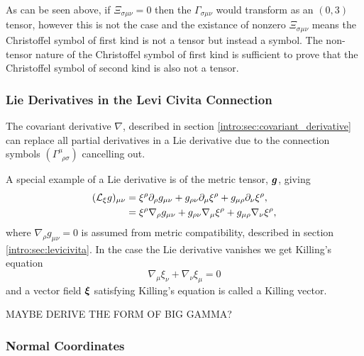 As can be seen above, if $\Xi_{\sigma\mu\nu}=0$ then the $\Gamma_{\sigma\mu\nu}$ would transform as an $(0,3)$ tensor, however this is not the case and the existance of nonzero $\Xi_{\sigma\mu\nu}$ means the Christoffel symbol of first kind is not a tensor but instead a symbol. The non-tensor nature of the Christoffel symbol of first kind is sufficient to prove that the Christoffel symbol of second kind is also not a tensor.


\subsubsection{Lie Derivatives in the Levi Civita Connection}

The covariant derivative $\nabla$, described in section \ref{intro:sec:covariant_derivative} can replace all partial derivatives in a Lie derivative due to the connection symbols $\left( \Gamma^\mu_{\,\,\,\rho\sigma}\right)$ cancelling out.

A special example of a Lie derivative is of the metric tensor, $\boldsymbol{g}$, giving
\begin{align}
(\mathcal{L}_\xi g)_{\mu\nu} &= \xi^\rho \partial_\rho g_{\mu\nu} + g_{\rho\nu}\partial_\mu \xi^\rho + g_{\mu\rho}\partial_\nu \xi^\rho, \\
&= \xi^\rho {\nabla_\rho g_{\mu\nu}} + g_{\rho\nu}\nabla_\mu \xi^\rho  + g_{\mu\rho}\nabla_\nu \xi^\rho, \\
\end{align}
where $\nabla_\rho g_{\mu\nu}=0$ is assumed from metric compatibility, described in section \ref{intro:sec:levicivita}. In the case the Lie derivative vanishes we get Killing's equation
\begin{equation}
\nabla_{\mu}\xi_\nu + \nabla_\nu \xi_\mu =0
\end{equation} 
and a vector field $\boldsymbol\xi$ satisfying Killing's equation is called a Killing vector.



MAYBE DERIVE THE FORM OF BIG GAMMA?


\subsubsection{Normal Coordinates}

